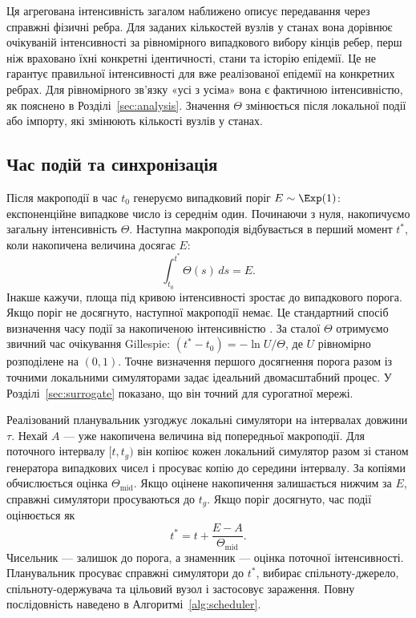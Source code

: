 Ця агрегована інтенсивність загалом наближено описує передавання через справжні фізичні ребра. Для заданих кількостей вузлів у станах вона дорівнює очікуваній інтенсивності за рівномірного випадкового вибору кінців ребер, перш ніж враховано їхні конкретні ідентичності, стани та історію епідемії. Це не гарантує правильної інтенсивності для вже реалізованої епідемії на конкретних ребрах. Для рівномірного зв'язку «усі з усіма» вона є фактичною інтенсивністю, як пояснено в Розділі~\ref{sec:analysis}. Значення $\Theta$ змінюється після локальної події або імпорту, які змінюють кількості вузлів у станах.

\subsection{Час подій та синхронізація}
\label{sec:timing}

Після макроподії в час $t_0$ генеруємо випадковий поріг $E\sim\Exp(1)$: експоненційне випадкове число із середнім один. Починаючи з нуля, накопичуємо загальну інтенсивність $\Theta$. Наступна макроподія відбувається в перший момент $t^\ast$, коли накопичена величина досягає $E$:
\begin{equation}
\label{eq:hazard_integral}
\int_{t_0}^{t^\ast}\Theta(s)\,ds=E.
\end{equation}
Інакше кажучи, площа під кривою інтенсивності зростає до випадкового порога. Якщо поріг не досягнуто, наступної макроподії немає. Це стандартний спосіб визначення часу події за накопиченою інтенсивністю \citep{ethier1986,anderson2007}. За сталої $\Theta$ отримуємо звичний час очікування Gillespie: $(t^\ast-t_0)=-\ln U/\Theta$, де $U$ рівномірно розподілене на $(0,1)$. Точне визначення першого досягнення порога разом із точними локальними симуляторами задає ідеальний двомасштабний процес. У Розділі~\ref{sec:surrogate} показано, що він точний для сурогатної мережі.

Реалізований планувальник узгоджує локальні симулятори на інтервалах довжини $\tau$. Нехай $A$ --- уже накопичена величина від попередньої макроподії. Для поточного інтервалу $[t,t_g)$ він копіює кожен локальний симулятор разом зі станом генератора випадкових чисел і просуває копію до середини інтервалу. За копіями обчислюється оцінка $\Theta_{\mathrm{mid}}$. Якщо оцінене накопичення залишається нижчим за $E$, справжні симулятори просуваються до $t_g$. Якщо поріг досягнуто, час події оцінюється як
\begin{equation}
\label{eq:interpolation}
t^\ast=t+\frac{E-A}{\Theta_{\mathrm{mid}}}.
\end{equation}
Чисельник --- залишок до порога, а знаменник --- оцінка поточної інтенсивності. Планувальник просуває справжні симулятори до $t^\ast$, вибирає спільноту-джерело, спільноту-одержувача та цільовий вузол і застосовує зараження. Повну послідовність наведено в Алгоритмі~\ref{alg:scheduler}.

